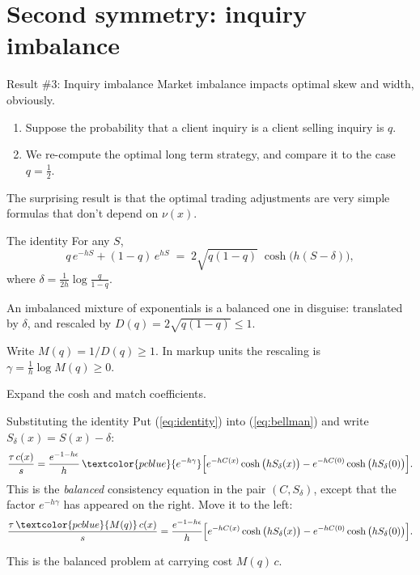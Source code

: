 \documentclass[10pt]{beamer}
\newcommand{\blue}[1]{\textcolor{pcblue}{#1}}
\begin{document}
\section{Second symmetry: inquiry imbalance}

\begin{frame}{Result \#3: Inquiry imbalance}
Market imbalance impacts optimal skew and width, obviously.
\begin{enumerate}
\item Suppose the probability that a client inquiry is a client selling inquiry is $q$.
\item We re-compute the optimal long term strategy, and compare it to the case $q = \tfrac12$.
\end{enumerate}
\vspace{1em}

The surprising result is that the optimal trading adjustments are very simple formulas that don't depend on $\nu(x)$.
\end{frame}

\begin{frame}{The identity}
For any $S$,
\begin{equation}
q\,e^{-hS} + (1-q)\,e^{hS}
\;=\; 2\sqrt{q(1-q)}\;\cosh\!\big(h(S - \delta)\big),
\label{eq:identity}
\end{equation}
where $\delta = \frac{1}{2h}\log\frac{q}{1-q}$.
\vspace{0.5em}

An imbalanced mixture of exponentials is a balanced one in disguise: \blue{translated} by $\delta$, and \blue{rescaled} by $D(q) = 2\sqrt{q(1-q)} \le 1$.
\vspace{1em}

Write $M(q) = 1/D(q) \ge 1$. In markup units the rescaling is $\gamma = \tfrac{1}{h}\log M(q) \ge 0$.
\vspace{1em}

Expand the cosh and match coefficients.
\end{frame}

\begin{frame}{Substituting the identity}
Put (\ref{eq:identity}) into (\ref{eq:bellman}) and write $S_\delta(x) = S(x) - \delta$:
{\small\[
\frac{\tau\,c(x)}{s} = \frac{e^{-1-h\epsilon}}{h}\,\blue{e^{-h\gamma}}
\Big[ e^{-hC(x)}\cosh\big(hS_\delta(x)\big) - e^{-hC(0)}\cosh\big(hS_\delta(0)\big) \Big].
\]}
This is the \emph{balanced} consistency equation in the pair $(C, S_\delta)$, except that the factor $e^{-h\gamma}$ has appeared on the right. Move it to the left:
{\small\[
\frac{\tau\,\blue{M(q)}\,c(x)}{s} = \frac{e^{-1-h\epsilon}}{h}
\Big[ e^{-hC(x)}\cosh\big(hS_\delta(x)\big) - e^{-hC(0)}\cosh\big(hS_\delta(0)\big) \Big].
\]}
\vspace{0.5em}

This is the balanced problem at carrying cost $M(q)\,c$.
\end{frame}
\end{document}
